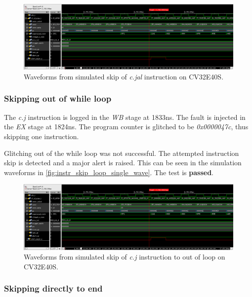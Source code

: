 \begin{figure}[h!]
    \centering
    \includegraphics[width=\textwidth]{docs/images/instr_skip_glitch_injection_single_core.png}
    \caption{Waveforms from simulated skip of \textit{c.jal} instruction on CV32E40S.}
    \label{fig:instr_skip_single_wave}
\end{figure}

\subsubsection{Skipping out of while loop}

The \textit{c.j} instruction is logged in the \textit{WB} stage at 1833ns. The fault is injected in the \textit{EX} stage at 1824ns. The program counter is glitched to be \textit{0x0000047c}, thus skipping one instruction.

Glitching out of the while loop was not successful. The attempted instruction skip is detected and a major alert is raised. This can be seen in the simulation waveforms in \autoref{fig:instr_skip_loop_single_wave}. The test is \textbf{passed}.

\begin{figure}[h!]
    \centering
    \includegraphics[width=\textwidth]{docs/images/instr_skip_glitch_injection_single_core.png}
    \caption{Waveforms from simulated skip of \textit{c.j} instruction to out of loop on CV32E40S.}
    \label{fig:instr_skip_loop_single_wave}
\end{figure}

\subsubsection{Skipping directly to end}

